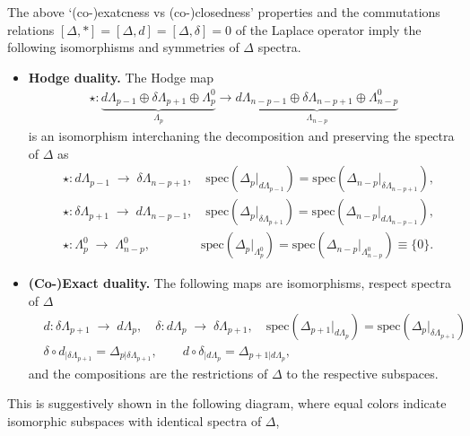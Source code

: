 \documentclass[../geometry_main.tex]{subfiles}
\begin{document}
\begin{mytheorem}
%
The above `(co-)exatcness vs (co-)closedness' properties and the commutations relations $[\Delta,*]=[\Delta,d]=[\Delta,\delta]=0$ of the Laplace operator imply the following isomorphisms and symmetries of $\Delta$ spectra.
\begin{itemize}
    \item \textbf{Hodge duality.} The Hodge map
    \begin{align}
        \star:\underbrace{d\Lambda_{p-1}\oplus \delta\Lambda_{p+1} \oplus \Lambda_p^0}_{\Lambda_p} \longrightarrow \underbrace{d\Lambda_{n-p-1}\oplus \delta\Lambda_{n-p+1} \oplus \Lambda_{n-p}^0}_{\Lambda_{n-p}}
    \end{align}
    is an isomorphism interchaning the decomposition and preserving the spectra of $\Delta$ as 
    \begin{align}
        &\star: d\Lambda_{p-1} \;\longrightarrow\; \delta\Lambda_{n-p+1},\quad \mathrm{spec}(\Delta_{p}|_{d\Lambda_{p-1}}) = \mathrm{spec}(\Delta_{n-p}|_{\delta\Lambda_{n-p+1}}),\\[6pt]
        &\star: \delta\Lambda_{p+1} \;\longrightarrow\; d\Lambda_{n-p-1},\quad \mathrm{spec}(\Delta_{p}|_{\delta\Lambda_{p+1}}) = \mathrm{spec}(\Delta_{n-p}|_{d\Lambda_{n-p-1}}),\\[6pt]
        &\star: \Lambda_p^0 \;\longrightarrow\; \Lambda_{n-p}^0, \qquad \qquad\mathrm{spec}(\Delta_p|_{\Lambda_p^0}) = \mathrm{spec}(\Delta_{n-p}|_{\Lambda_{n-p}^0})\equiv \{0\}.
    \end{align}
    \item \textbf{(Co-)Exact duality.} The following maps are isomorphisms, respect spectra of $\Delta$ 
    \begin{align}
        &d: \delta\Lambda_{p+1} \;\longrightarrow\; d\Lambda_{p},\quad
        \delta: d\Lambda_{p} \;\longrightarrow\; \delta\Lambda_{p+1}, \quad \mathrm{spec}(\Delta_{p+1}|_{d\Lambda_{p}}) = \mathrm{spec}(\Delta_p|_{\delta\Lambda_{p+1}})\\[7pt]
        &\delta\circ d_{|\delta\Lambda_{p+1}} = \Delta_{p|\delta\Lambda_{p+1}},\qquad d\circ \delta_{|d\Lambda_p} = \Delta_{p+1|d\Lambda_p},
    \end{align}
    and the compositions are the restrictions of $\Delta$ to the respective subspaces. 
\end{itemize}
%
This is suggestively shown in the following diagram, where equal colors indicate isomorphic subspaces with identical spectra of $\Delta$,


\end{mytheorem}
\end{document}
